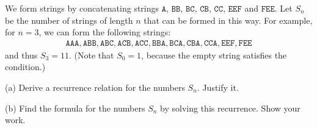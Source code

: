 
\newcommand{\ttA}{\texttt{A}}
\newcommand{\ttB}{\texttt{B}}
\newcommand{\ttC}{\texttt{C}}
\newcommand{\ttE}{\texttt{E}}
\newcommand{\ttF}{\texttt{F}}

\begin{problem}
We form strings by concatenating strings $\ttA$, $\ttB\ttB$, $\ttB\ttC$, $\ttC\ttB$, $\ttC\ttC$,
$\ttE\ttE\ttF$ and $\ttF\ttE\ttE$. Let $S_n$ be the number of strings of length $n$ that can
be formed in this way. For example, for $n=3$, we can form the following strings:
%
\begin{align*}
\ttA\ttA\ttA
,
\ttA\ttB\ttB  , \ttA\ttB\ttC  , \ttA\ttC\ttB  , \ttA\ttC\ttC
,
\ttB\ttB\ttA  , \ttB\ttC\ttA  , \ttC\ttB\ttA  , \ttC\ttC\ttA 
,
\ttE\ttE\ttF , \ttF\ttE\ttE
\end{align*}
%
and thus $S_3 = 11$. (Note that $S_0 = 1$, because the
empty string satisfies the condition.)

\smallskip
\noindent (a) Derive a recurrence relation for
        the numbers $S_n$. Justify it.

\smallskip
\noindent (b) Find the formula for the numbers $S_n$
                by solving this recurrence.
                Show your work.
\end{problem}

